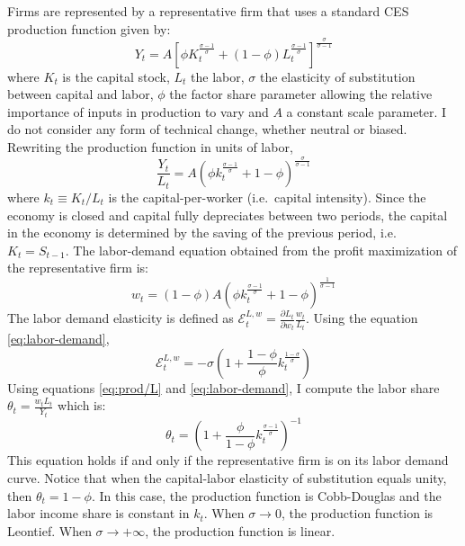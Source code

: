 \documentclass[
]{article}
\begin{document}
Firms are represented by a representative firm that uses a standard CES production function given by:
\begin{equation}
Y_t = A\left[ \phi K_t^{\frac{\sigma - 1}{\sigma}} + (1-\phi) L_t^{\frac{\sigma - 1}{\sigma}}\right]^{\frac{\sigma}{\sigma-1}} \label{eq:prod}
\end{equation}
where \(K_t\) is the capital stock, \(L_t\) the labor, \(\sigma\) the elasticity of substitution between capital and labor, \(\phi\) the factor share parameter allowing the relative importance of inputs in production to vary and \(A\) a constant scale parameter. I do not consider any form of technical change, whether neutral or biased. Rewriting the production function in units of labor,
\begin{equation}
    \frac{Y_t}{L_t} = A\left(\phi k_t^{\frac{\sigma-1}{\sigma}} + 1-\phi\right)^{\frac{\sigma}{\sigma-1}} \label{eq:prod/L}
\end{equation}
where \(k_t\equiv K_t/L_t\) is the capital-per-worker (i.e.~capital intensity). Since the economy is closed and capital fully depreciates between two periods, the capital in the economy is determined by the saving of the previous period, i.e.~\(K_t = S_{t-1}\). The labor-demand equation obtained from the profit maximization of the representative firm is:
\begin{equation}
    w_t = (1-\phi)A\left(\phi k_t^{\frac{\sigma-1}{\sigma}}+1-\phi\right)^{\frac{1}{\sigma-1}} \label{eq:labor-demand}
\end{equation}
The labor demand elasticity is defined as \(\mathcal{E}^{L,w}_t=\frac{\partial L_t}{\partial w_t}\frac{w_t}{L_t}\). Using the equation \eqref{eq:labor-demand},
\begin{equation}
    \mathcal{E}^{L,w}_t = -\sigma\left(1+\frac{1-\phi}{\phi}k_t^{\frac{1-\sigma}{\sigma}}\right) \label{eq:labor-elasticity}
\end{equation}
Using equations \eqref{eq:prod/L} and \eqref{eq:labor-demand}, I compute the labor share \(\theta_t = \frac{w_tL_t}{Y_t}\) which is:
\begin{equation}
    \theta_t = \left(1+\frac{\phi}{1-\phi}k_t^{\frac{\sigma-1}{\sigma}}\right)^{-1} \label{eq:theta}
\end{equation}
This equation holds if and only if the representative firm is on its labor demand curve. Notice that when the capital-labor elasticity of substitution equals unity, then \(\theta_t=1-\phi\). In this case, the production function is Cobb-Douglas and the labor income share is constant in \(k_t\). When \(\sigma \to 0\), the production function is Leontief. When \(\sigma \to +\infty\), the production function is linear.
\end{document}
